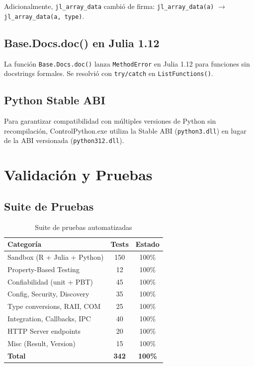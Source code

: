 \documentclass[12pt, a4paper]{report}
\begin{document}
Adicionalmente, \texttt{jl\_array\_data} cambió de firma: \texttt{jl\_array\_data(a)} $\rightarrow$ \texttt{jl\_array\_data(a, type)}.

\section{Base.Docs.doc() en Julia 1.12}

La función \texttt{Base.Docs.doc()} lanza \texttt{MethodError} en Julia 1.12 para funciones sin docstrings formales. Se resolvió con \texttt{try/catch} en \texttt{ListFunctions()}.

\section{Python Stable ABI}

Para garantizar compatibilidad con múltiples versiones de Python sin recompilación, ControlPython.exe utiliza la Stable ABI (\texttt{python3.dll}) en lugar de la ABI versionada (\texttt{python312.dll}).

\chapter{Validación y Pruebas}

\section{Suite de Pruebas}

\begin{table}[H]
\centering
\begin{tabular}{lcc}
\toprule
\textbf{Categoría} & \textbf{Tests} & \textbf{Estado} \\
\midrule
Sandbox (R + Julia + Python) & 150 & 100\% \\
Property-Based Testing & 12 & 100\% \\
Confiabilidad (unit + PBT) & 45 & 100\% \\
Config, Security, Discovery & 35 & 100\% \\
Type conversions, RAII, COM & 25 & 100\% \\
Integration, Callbacks, IPC & 40 & 100\% \\
HTTP Server endpoints & 20 & 100\% \\
Misc (Result, Version) & 15 & 100\% \\
\midrule
\textbf{Total} & \textbf{342} & \textbf{100\%} \\
\bottomrule
\end{tabular}
\caption{Suite de pruebas automatizadas}
\end{table}
\end{document}
